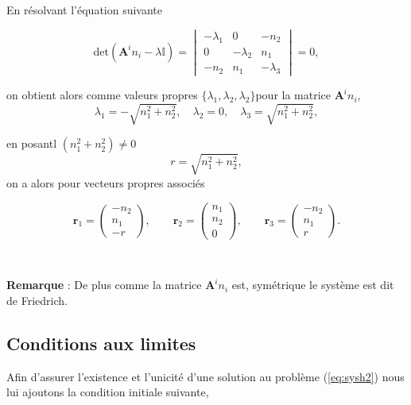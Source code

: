 \documentclass[a4paper,oneside,10pt]{report}
\begin{document}
En résolvant l'équation suivante

\begin{equation}
\mbox{det} (\mathbf{A}^i n_i - \lambda\mathbb{I}) =
\begin{vmatrix}
-\lambda_1 & 0 & -n_2\\
0 & -\lambda_2 & n_1\\
-n_2 & n_1 & -\lambda_3
\end{vmatrix}
=0,
\end{equation}

on obtient alors comme valeurs propres $\{\lambda_1,\lambda_2,\lambda_2\}$pour la matrice $\mathbf{A}^i n_i$, 
\begin{equation}
\label{eq:vp}
\lambda_1 = -\sqrt{n_1^2 + n_2^2},\quad \lambda_2 =0,\quad \lambda_3 = \sqrt{n_1^2 + n_2^2},
\end{equation}

en posantl $(n_1^2 + n_2^2) \neq 0 $ 
$$r=\sqrt{n_1^2 + n_2^2},$$
on a alors pour vecteurs propres associés

\begin{equation}
\mathbf{r}_{1}=
\begin{pmatrix}
-n_2\\
n_1\\
-r
\end{pmatrix},
\qquad
\mathbf{r}_2=
\begin{pmatrix}
n_1\\
n_2\\
0
\end{pmatrix},
\qquad
\mathbf{r}_{3}=
\begin{pmatrix}
-n_2\\
n_1\\
r
\end{pmatrix}.
\end{equation}
\begin{center}
\\
\end{center}
\textbf{Remarque} : De plus comme la matrice $\mathbf{A}^in_i $ est, symétrique le système est dit de Friedrich.\\


\subsection{Conditions aux limites}

Afin d'assurer l'existence et l'unicité d'une solution au problème (\ref{eq:sysh2}) nous lui ajoutons la condition initiale suivante,
\end{document}
